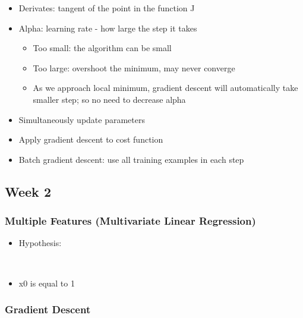 \documentclass[]{article}
\providecommand{\tightlist}{%
  \setlength{\itemsep}{0pt}\setlength{\parskip}{0pt}}
\begin{document}
\begin{itemize}
\tightlist
\item
  Derivates: tangent of the point in the function J
\item
  Alpha: learning rate - how large the step it takes

  \begin{itemize}
  \tightlist
  \item
    Too small: the algorithm can be small
  \item
    Too large: overshoot the minimum, may never converge
  \item
    As we approach local minimum, gradient descent will automatically
    take smaller step; so no need to decrease alpha
  \end{itemize}
\item
  Simultaneously update parameters
\item
  Apply gradient descent to cost function
\item
  Batch gradient descent: use all training examples in each step
\end{itemize}

\hypertarget{week-2}{%
\subsection{Week 2}\label{week-2}}

\hypertarget{multiple-features-multivariate-linear-regression}{%
\subsubsection{Multiple Features (Multivariate Linear
Regression)}\label{multiple-features-multivariate-linear-regression}}

\begin{itemize}
\tightlist
\item
  Hypothesis:
\end{itemize}

~

\begin{itemize}
\tightlist
\item
  x0 is equal to 1
\end{itemize}

\hypertarget{gradient-descent-1}{%
\subsubsection{Gradient Descent}\label{gradient-descent-1}}
\end{document}
